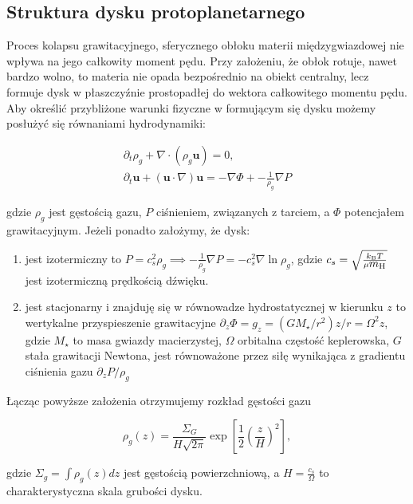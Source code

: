 \subsection{Struktura dysku protoplanetarnego}
Proces kolapsu grawitacyjnego, sferycznego obłoku materii międzygwiazdowej nie
wpływa na jego całkowity moment pędu. Przy założeniu, że obłok rotuje, nawet
bardzo wolno, to materia nie opada bezpośrednio na obiekt
centralny, lecz formuje dysk w płaszczyźnie prostopadłej do wektora całkowitego
momentu pędu. Aby określić przybliżone warunki fizyczne w formującym się dysku
możemy posłużyć się równaniami hydrodynamiki:

\begin{gather}
   \partial_t \rho_g + \nabla\cdot\left(\rho_g\mathbf{u}\right) = 0,
   \label{eq:hd1}\\
\partial_t \mathbf{u} + \left(\mathbf{u}\cdot\nabla\right)\mathbf{u} = 
-\nabla\Phi + -\frac{1}{\rho_g} \nabla P \label{eq:hd2}
\end{gather}

gdzie $\rho_g$ jest gęstością gazu, $P$ ciśnieniem, 
związanych z tarciem, a $\Phi$ potencjałem grawitacyjnym. Jeżeli ponadto
założymy, że dysk:

\begin{enumerate}
   \item jest izotermiczny to $P = c_s^2 \rho_g \implies -\frac{1}{\rho_g}\nabla
      P = -c_s^2\nabla\ln\rho_g$, gdzie $c_s = \sqrt{\frac{k_{\textrm{B}} T}{\mu
    \hbox{$m_{\textrm{H}}$}}}$ jest izotermiczną prędkością dźwięku.
   \item jest stacjonarny i znajduję się w równowadze hydrostatycznej w kierunku
      $z$ to wertykalne przyspieszenie grawitacyjne $\partial_z \Phi = g_z =
      (GM_\star/r^2) z/r = \Omega^2 z$, gdzie $M_\star$ to masa gwiazdy
      macierzystej, $\Omega$ orbitalna częstość keplerowska, $G$ stała
      grawitacji Newtona, jest równoważone przez siłę wynikająca z gradientu
      ciśnienia gazu $\partial_z P / \rho_g$
\end{enumerate}

Łącząc powyższe założenia otrzymujemy rozkład gęstości gazu

\begin{equation} \label{eq:zeq}
   \rho_g(z) = \frac{\Sigma_G}{H\sqrt{2\pi}} \exp \left[
   \frac{1}{2}\left(\frac{z}{H}\right)^2 \right],
\end{equation}

gdzie $\Sigma_g = \int \rho_g(z) dz$ jest gęstością powierzchniową, a
$H=\frac{c_s}{\Omega}$ to charakterystyczna skala grubości dysku.


